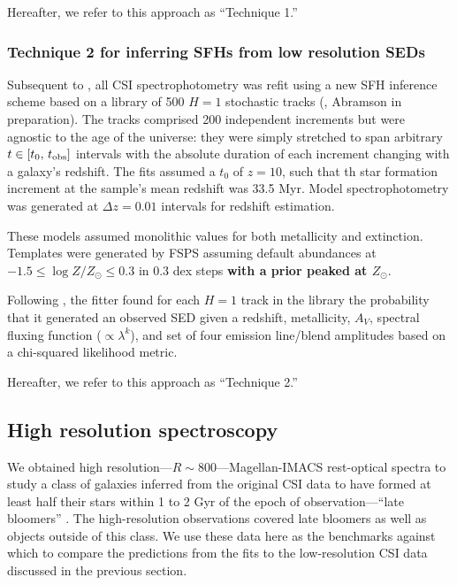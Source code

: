 \documentclass[a4paper,fleqn,usenatbib]{mnras}
\newcommand{\logZ}{\log Z/Z_{\odot}}
\newcommand{\bfr}{\bf\color{red}}
\newcommand{\tobs}{t_{\rm obs}}
\begin{document}
Hereafter, we refer to this approach as ``Technique 1.''

\subsubsection{Technique 2 for inferring SFHs from low resolution SEDs}
\label{sec:h1}

Subsequent to \citet{Dressler18}, all CSI spectrophotometry was refit using a new 
SFH inference scheme based on a library of 500 $H=1$ stochastic tracks
(\citealt{Kelson14,Kelson16,Kelson20,Abramson20b}, Abramson in preparation). The tracks 
comprised 200 independent increments but were agnostic to the age of the universe: they were 
simply stretched to span arbitrary $t\in[t_{0},\,\tobs]$ intervals with the absolute duration of 
each increment changing with a galaxy's redshift. The fits assumed a $t_{0}$ of $z=10$, such that
th star formation increment at the sample's mean redshift was 33.5 Myr. Model spectrophotometry 
was generated at $\Delta z = 0.01$ intervals for redshift estimation.

These models assumed monolithic values for both metallicity and extinction. Templates were 
generated by FSPS assuming default abundances at $-1.5\leq\logZ\leq0.3$ in 0.3 dex steps 
{\bfr with a prior peaked at $Z_{\odot}$}.

Following \citealt{Pacifici12}, the fitter found for each $H=1$ track in the library the probability 
that it generated an observed SED given a redshift, metallicity, $A_{V}$, spectral fluxing function 
({\bfr $\propto \lambda^{k}$}), and set of four emission line/blend amplitudes based on a
chi-squared likelihood metric.

Hereafter, we refer to this approach as ``Technique 2.''

\subsection{High resolution spectroscopy}
\label{sec:hiRes}

We obtained high resolution---$R\sim800$---Magellan-IMACS rest-optical spectra to study 
a class of galaxies inferred from the original CSI data to have formed at least half their stars within 
1 to 2 Gyr of the epoch of observation---``late bloomers'' \citep[][]{Dressler16, Dressler18}. The 
high-resolution observations covered late bloomers as well as objects outside of this class. We use 
these data here as the benchmarks against which to compare the predictions from the fits to the 
low-resolution CSI data discussed in the previous section.
\end{document}
